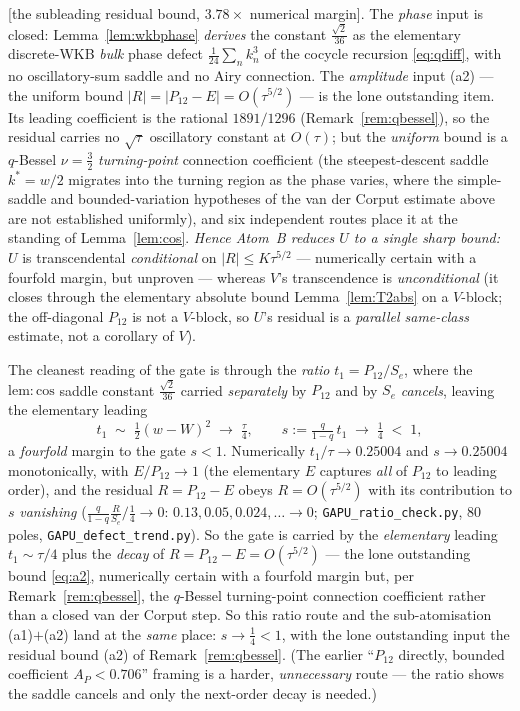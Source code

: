 \begin{remark}[The assembly: $R=O(\tau^{5/2})$ via the q-Bessel stationary-phase asymptotic coupled to the
travel-block phase]
\textup[the subleading residual bound, $3.78\times$ numerical margin\textup]. The \emph{phase} input is closed:
Lemma~\ref{lem:wkbphase} \emph{derives} the constant $\tfrac{\sqrt2}{36}$ as the elementary discrete-WKB
\emph{bulk} phase defect $\tfrac1{24}\sum_n k_n^3$ of the cocycle recursion \eqref{eq:qdiff}, with no
oscillatory-sum saddle and no Airy connection. The \emph{amplitude} input (a2) --- the uniform bound
$|R|=|P_{12}-E|=O(\tau^{5/2})$ --- is the lone outstanding item. Its leading coefficient is the rational
$1891/1296$ (Remark~\ref{rem:qbessel}), so the residual carries no $\sqrt\tau$ oscillatory constant at $O(\tau)$;
but the \emph{uniform} bound is a $q$-Bessel $\nu=\tfrac32$ \emph{turning-point} connection coefficient (the
steepest-descent saddle $k^\ast=w/2$ migrates into the turning region as the phase varies, where the
simple-saddle and bounded-variation hypotheses of the van der Corput estimate above are not established
uniformly), and six independent routes place it at the standing of Lemma~\ref{lem:cos}. \emph{Hence Atom~B reduces
$U$ to a single sharp bound:} $U$ is transcendental \emph{conditional} on $|R|\le K\tau^{5/2}$ --- numerically
certain with a fourfold margin, but unproven --- whereas $V$'s transcendence is \emph{unconditional} (it closes
through the elementary absolute bound Lemma~\ref{lem:T2abs} on a $V$-block; the off-diagonal $P_{12}$ is not a
$V$-block, so $U$'s residual is a \emph{parallel same-class} estimate, not a corollary of $V$).

The cleanest
reading of the gate is through the \emph{ratio} $t_1=P_{12}/S_e$, where the $\mathrm{lem:cos}$ saddle constant
$\tfrac{\sqrt2}{36}$ carried \emph{separately} by $P_{12}$ and by $S_e$ \emph{cancels}, leaving the elementary
leading
\[
   t_1\;\sim\;\tfrac12(w-W)^2\;\longrightarrow\;\tfrac\tau4,\qquad
   s:=\tfrac{q}{1-q}\,t_1\;\longrightarrow\;\tfrac14\;<\;1,
\]
a \emph{fourfold} margin to the gate $s<1$. Numerically $t_1/\tau\to0.25004$ and $s\to0.25004$ monotonically,
with $E/P_{12}\to1$ (the elementary $E$ captures \emph{all} of $P_{12}$ to leading order), and the residual
$R=P_{12}-E$ obeys $R=O(\tau^{5/2})$ with its contribution to $s$ \emph{vanishing} ($\frac{q}{1-q}\frac{R}{S_e}/
\tfrac14\to0$: $0.13,0.05,0.024,\dots\to0$; \texttt{GAPU\_ratio\_check.py}, $80$ poles, \texttt{GAPU\_defect\_trend.py}).
So the gate is carried by the \emph{elementary} leading $t_1\sim\tau/4$ plus the \emph{decay} of $R=P_{12}-E=
O(\tau^{5/2})$ --- the lone outstanding bound \eqref{eq:a2}, numerically certain with a fourfold margin but, per
Remark~\ref{rem:qbessel}, the $q$-Bessel turning-point connection coefficient rather than a closed van der Corput
step. So this
ratio route and the sub-atomisation \textup{(a1)}$+$\textup{(a2)} land at the \emph{same} place: $s\to\tfrac14<1$,
with the lone outstanding input the residual bound \textup{(a2)} of Remark~\ref{rem:qbessel}. \textup(The earlier ``$P_{12}$ directly, bounded coefficient
$A_P<0.706$'' framing is a harder, \emph{unnecessary} route --- the ratio shows the saddle cancels and only the
next-order decay is needed.\textup)


\end{remark}
